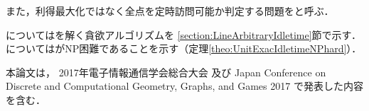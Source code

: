 また，利得最大化ではなく全点を定時訪問可能か判定する問題を{\timeSpecifiedPatProbDecision}と呼ぶ．


{\graphLine}については{\timeSpecifiedPatProbDecision}を解く貪欲アルゴリズムを
\ref{section:LineArbitraryIdletime}節で示す．
{\graphUnit}については{\timeSpecifiedPatProb}がNP困難であることを示す（定理\ref{theo:UnitExacIdletimeNPhard}）．


本論文は，
2017年電子情報通信学会総合大会\cite{ieice}%
及び
Japan Conference on Discrete and Computational Geometry, Graphs, and Games 2017\cite{jcdcggg}%
で発表した内容を含む．

